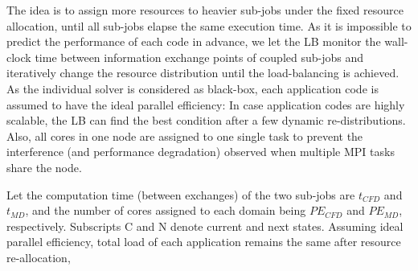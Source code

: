 \documentclass[preprint,12pt]{elsarticle}
\newcommand{\skonote}[1]{ {\textcolor{green} { ***Jeff: #1 }}}
\newcommand{\skonote}[1]{}
\begin{document}
The idea is to assign more resources to heavier sub-jobs 
under the fixed resource allocation, until all sub-jobs elapse the same execution time.
As it is impossible to predict the performance of each code in advance, we let 
the LB monitor the wall-clock time between information exchange points of 
coupled sub-jobs and iteratively change the resource distribution 
until the load-balancing is achieved. As the individual solver is considered as black-box, 
each application code is assumed to have the ideal parallel efficiency: 
In case application codes are highly scalable, the LB can find the best condition 
after a few dynamic re-distributions. Also, all cores in one node are assigned to 
one single task to prevent the interference (and performance degradation)
observed when multiple MPI tasks share the node.




Let the computation time (between exchanges) of the two sub-jobs are $t_{CFD}$ and $t_{MD}$, and the number of cores assigned to each domain being $PE_{CFD}$ and $PE_{MD}$, respectively. Subscripts C and N denote current and next states. Assuming ideal parallel efficiency, total load of each application remains the same after resource re-allocation,
\end{document}
